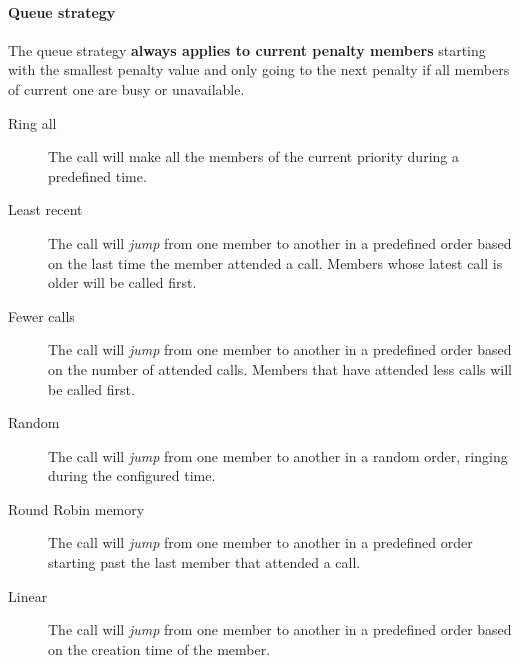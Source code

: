 \documentclass[letterpaper,10pt,spanish]{sphinxmanual}
\begin{document}
\paragraph{Queue strategy}
\label{administration_portal/client/vpbx/routing_endpoints/queues:queue-strategy}
The queue strategy \textbf{always applies to current penalty members} starting with
the smallest penalty value and only going to the next penalty if all members of
current one are busy or unavailable.
\begin{description}
\item[{Ring all}] \leavevmode{}\label{administration_portal/client/vpbx/routing_endpoints/queues:term-ring-all}
The call will make all the members of the current priority during a
predefined time.

\item[{Least recent}] \leavevmode{}\label{administration_portal/client/vpbx/routing_endpoints/queues:term-least-recent}
The call will \emph{jump} from one member to another in a predefined order
based on the last time the member attended a call. Members whose latest
call is older will be called first.

\item[{Fewer calls}] \leavevmode{}\label{administration_portal/client/vpbx/routing_endpoints/queues:term-fewer-calls}
The call will \emph{jump} from one member to another in a predefined order
based on the number of attended calls. Members that have attended less
calls will be called first.

\item[{Random}] \leavevmode{}\label{administration_portal/client/vpbx/routing_endpoints/queues:term-random}
The call will \emph{jump} from one member to another in a random order,
ringing during the configured time.

\item[{Round Robin memory}] \leavevmode{}\label{administration_portal/client/vpbx/routing_endpoints/queues:term-round-robin-memory}
The call will \emph{jump} from one member to another in a predefined order
starting past the last member that attended a call.

\item[{Linear}] \leavevmode{}\label{administration_portal/client/vpbx/routing_endpoints/queues:term-linear}
The call will \emph{jump} from one member to another in a predefined order
based on the creation time of the member.

\end{description}
\end{document}
